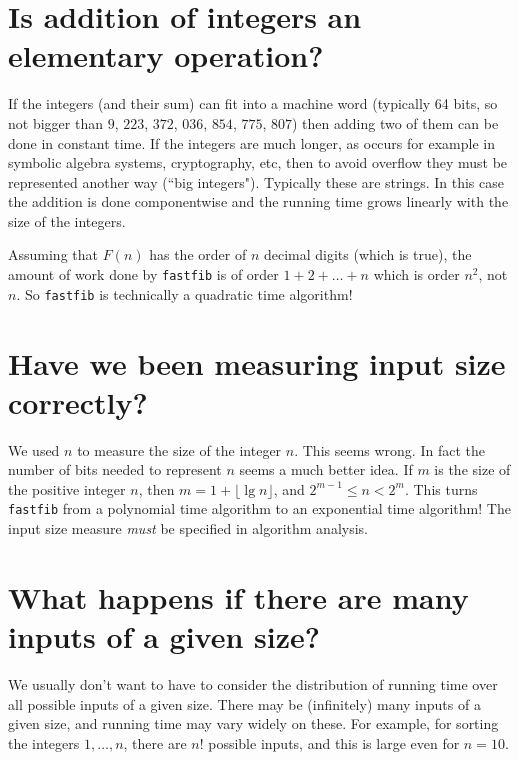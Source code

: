 \section{Is addition of integers an elementary operation?}

If the integers (and their sum) can fit into a machine word (typically 64 bits, so not bigger than $9$, $223$, $372$, $036$, $854$, $775$, $807$) then 
adding two of them can be done in constant time. If the integers are much longer, as occurs for example in symbolic algebra systems, cryptography, etc, then to avoid overflow they must be represented another way (``big integers"). Typically these are strings. In this case the addition is done componentwise and the running time grows linearly with the size of the integers. 

\begin{Boxample}
Assuming that $F(n)$ has the order of $n$ decimal digits (which is true), the amount of work 
done by \texttt{fastfib} is of order $1+2+\dots + n$ which is order $n^2$, not $n$. 
So \texttt{fastfib} is technically a quadratic time algorithm!
\end{Boxample}


\section{Have we been measuring input size correctly?}

We used $n$ to measure the size of the integer $n$. This seems wrong. In fact the number of bits needed to represent $n$ seems a much better 
idea. If $m$ is the size of the positive integer $n$, then $m = 1+\lfloor\lg n\rfloor$, and $2^{m-1} \leq n < 2^m$.
This turns \texttt{fastfib} from a polynomial time algorithm to an exponential time algorithm! The input size measure \emph{must} be specified in algorithm analysis.



\section{What happens if there are many inputs of a given size?}

We usually don't want to have to consider the distribution of
running time over all possible inputs of a given size. There may be (infinitely)
many inputs of a given size, and running time may vary widely on these. 
For example, for sorting the integers $1, \dots, n$, there are $n!$ possible inputs, and this is large even for $n=10$.

